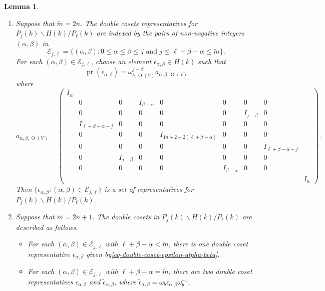 \documentclass[12pt]{amsart}
\newcommand{\wt}{\widetilde}
\newtheorem{lemma}[theorem]{Lemma}
\theoremstyle{remark}
\newcommand{\pr}{\operatorname{pr}}
\DeclareMathOperator{\Orth}{O}
\begin{document}
\begin{lemma}
\label{lemma-double-coset-decomposition}
\begin{enumerate}
\item[(a)] Suppose that $\wt m=2n$. The double cosets representatives for $P_j(k)\backslash H(k)/P_\ell(k)$ are indexed by the pairs of non-negative integers $(\alpha, \beta)$ in
\begin{equation}
\label{eq-double-coset-index-set-Ekl}
\mathcal{E}_{j,\ell}=\{ (\alpha, \beta): 0\le \alpha \le \beta \le j \text{ and } j\le \ell +\beta-\alpha \le \tilde{m} \}.	
\end{equation}
For each $(\alpha, \beta)\in \mathcal{E}_{j,\ell}$, choose an element $\epsilon_{\alpha,\beta}\in H(k)$ such that
\begin{equation}
\label{eq-double-coset-epsilon-alpha-beta}
	 \pr(\epsilon_{\alpha,\beta}) 	 =  \omega_{b,\Orth(V)}^{j-\beta}   a_{\alpha, \beta, \Orth(V)} 
\end{equation}
where   
\begin{equation}
\label{eq-a-alpha-beta}
 a_{\alpha, \beta, \Orth(V)} = 
\begin{pmatrix}
I_{\alpha} &&&&&&&\\
&0&0&I_{\beta-\alpha} &0&0&0&0&\\
&0&0&0&0&0&I_{j-\beta}&0&\\
&I_{\ell+\beta-\alpha-j} &0&0&0&0&0&0&\\
&0&0&0&I_{4n+2-2(\ell+\beta-\alpha)} &0&0&0&\\
&0&0&0&0&0&0&I_{\ell+\beta-\alpha-j}&\\
&0&I_{j-\beta}&0&0&0 &0&0&\\
&0&0 &0&0&I_{\beta-\alpha}&0&0&\\
&&&&&&&&I_\alpha 
\end{pmatrix}.
\end{equation}
Then $\{\epsilon_{\alpha, \beta}: (\alpha, \beta)\in \mathcal{E}_{j,\ell} \}$ is a set of representatives for $P_j(k)\backslash H(k)/P_\ell(k)$.

\item[(b)] Suppose that $\wt m =2n+1$. The double cosets in $P_j(k)\backslash H(k)/P_\ell(k)$ are described as follows.
\begin{itemize}
\item[(1)] For each $(\alpha,\beta)\in \mathcal{E}_{j,\ell}$ with $\ell+\beta-\alpha<\wt m$, there is one double coset representative $\epsilon_{\alpha, \beta}$ given by\eqref{eq-double-coset-epsilon-alpha-beta}.
\item[(2)] For each $(\alpha,\beta)\in \mathcal{E}_{j,\ell}$ with $\ell+\beta-\alpha=\wt m$, there are two double coset representatives $\epsilon_{\alpha, \beta}$ and $\tilde{\epsilon}_{\alpha, \beta}$, where $ \tilde{\epsilon}_{\alpha, \beta} =\omega_b  {\epsilon}_{\alpha, \beta}  \omega_b^{-1}$.
\end{itemize}
\end{enumerate}
\end{lemma}
\end{document}
